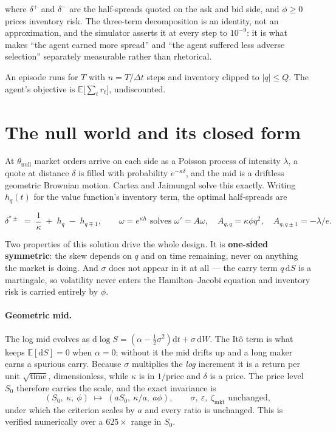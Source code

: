 \documentclass[11pt,a4paper]{article}
\newcommand{\dt}{\Delta t}
\newcommand{\thnull}{\theta_{\mathrm{null}}}
\begin{document}
where $\delta^{+}$ and $\delta^{-}$ are the half-spreads quoted on the ask and bid
side, and $\phi \ge 0$ prices inventory risk. The three-term decomposition is an
identity, not an approximation, and the simulator asserts it at every step to
$10^{-9}$: it is what makes ``the agent earned more spread'' and ``the agent
suffered less adverse selection'' separately measurable rather than rhetorical.

An episode runs for $T$ with $n = T/\dt$ steps and inventory clipped to
$|q| \le Q$. The agent's objective is $\mathbb{E}\big[\sum_t r_t\big]$, undiscounted.

\section{The null world and its closed form}

At $\thnull$ market orders arrive on each side as a Poisson process of intensity
$\lambda$, a quote at distance $\delta$ is filled with probability
$e^{-\kappa\delta}$, and the mid is a driftless geometric Brownian motion. Cartea
and Jaimungal solve this exactly. Writing $h_q(t)$ for the value function's
inventory term, the optimal half-spreads are

\begin{equation}
  \delta^{*\pm} \;=\; \frac{1}{\kappa} \;+\; h_q \;-\; h_{q\mp1},
  \qquad
  \omega = e^{\kappa h} \text{ solves } \omega' = A\omega,
  \quad
  A_{q,q} = \kappa\phi q^2,
  \quad
  A_{q,q\pm1} = -\lambda/e .
\end{equation}

Two properties of this solution drive the whole design. It is \textbf{one-sided
symmetric}: the skew depends on $q$ and on time remaining, never on anything the
market is doing. And $\sigma$ does not appear in it at all --- the carry term
$q\,\mathrm{d}S$ is a martingale, so volatility never enters the Hamilton--Jacobi
equation and inventory risk is carried entirely by $\phi$.

\paragraph{Geometric mid.} The log mid evolves as
$\mathrm{d}\log S = (\alpha - \tfrac12\sigma^2)\mathrm{d}t + \sigma\,\mathrm{d}W$.
The It\^o term is what keeps $\mathbb{E}[\mathrm{d}S] = 0$ when $\alpha = 0$; without
it the mid drifts up and a long maker earns a spurious carry. Because $\sigma$
multiplies the \emph{log} increment it is a return per unit $\sqrt{\text{time}}$,
dimensionless, while $\kappa$ is in $1/\text{price}$ and $\delta$ is a price. The
price level $S_0$ therefore carries the scale, and the exact invariance is
\begin{equation}
  (S_0,\ \kappa,\ \phi) \;\longmapsto\; (aS_0,\ \kappa/a,\ a\phi),
  \qquad \sigma,\ \varepsilon,\ \zeta_{\mathrm{mkt}} \text{ unchanged},
\end{equation}
under which the criterion scales by $a$ and every ratio is unchanged. This is
verified numerically over a $625\times$ range in $S_0$.
\end{document}

